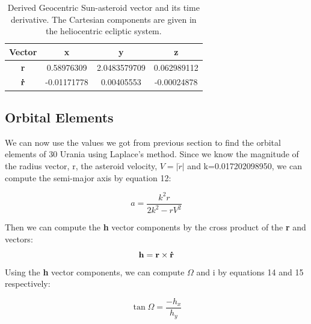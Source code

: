 \documentclass[letterpaper,12pt]{article}
\begin{document}
\FloatBarrier
\begin{table}[h!]
\caption{Derived Geocentric Sun-asteroid vector and its time derivative. The Cartesian components are given in the heliocentric ecliptic system.} %
\centering %
\begin{tabular}{| c | c | c | c |} %
\hline %
Vector & x & y & z \\ [0.5ex] %
\hline %
{\bf r}  & 0.58976309  &  2.0483579709 &  0.062989112\\ \hline
\begin{math} {\bf \dot{r}} \end{math} & -0.01171778  &  0.00405553 &  -0.00024878 \\  [1ex] %
\hline %
\end{tabular}
\label{table:nonlin} %
\end{table}
\FloatBarrier




\subsection{Orbital Elements}
We can now use the values we got from previous section to find the orbital elements of 30 Urania using Laplace's method. Since we know the magnitude of the radius vector, r, the asteroid velocity, \begin{math}V=|\dot{r}| \end{math} and k=0.017202098950, we can compute the semi-major axis by equation 12:

\begin{equation}
a=\frac{k^2r}{2k^2-rV^2}
\end{equation}

Then we can compute the {\bf h} vector components by the cross product of the {\bf r} and {\bf {}} vectors:
\begin{equation}
{\bf h}= {\bf r} \times {\bf \dot{r}}
\end{equation}
Using the {\bf h} vector components, we can compute \begin{math} \Omega \end{math} and i by equations 14 and 15 respectively:

\begin{equation}
\tan \Omega = \frac{-h_{x}}{h_{y}}
\end{equation}
\end{document}
